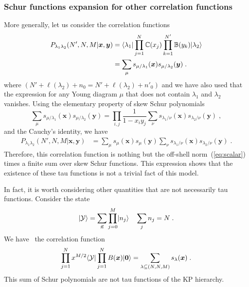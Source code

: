 \documentclass[a4paper,11pt]{amsart}
\begin{document}
\subsubsection{Schur functions expansion for other correlation functions}
More generally, let us consider the correlation functions 
\begin{equation}
\begin{split}
  P_{\lambda_1 \lambda_2}(N', N, M|\bm{x}, \bm{y}) & =
  \langle\lambda_1\rvert \prod_{j=1}^N \mathbb{C}(x_j)
  \prod_{k=1}^{N'} \mathbb{B}(y_k)\lvert\lambda_2\rangle \\
  & = \sum_{\mu} s_{\mu/\lambda_1}(\bm{x}) s_{\mu/\lambda_2}(\bm{y}) \; .
\end{split}
\end{equation}
where \((N' + \ell(\lambda_2) + n_0 = N' + \ell(\lambda_2) + n'_0)\) and 
we have also used that the expression for any Young diagram
\(\mu\) that does not contain \(\lambda_1\) and \(\lambda_2\)
vanishes. Using the elementary property of skew Schur
polynomials~\cite{Macdonald:1998}
\begin{equation}
  \sum_{\mu} s_{\mu/\lambda_1}(\bm{x}) s_{\mu/\lambda_2}(\bm{y}) = \prod_{i,j}\frac{1}{1 - x_i y_j}
 \sum_\nu s_{\lambda_1/\nu}(\bm{x}) s_{\lambda_2/\nu}(\bm{y})\; ,
\end{equation}
and the Cauchy's identity, we have 
\begin{equation}
\begin{split}
  P_{\lambda_1 \lambda_2}(N', N, M|\bm{x}, \bm{y}) & =
 \sum_\mu s_{\mu}(\bm{x}) s_{\mu}(\bm{y})
 \sum_\nu s_{\lambda_1/\nu}(\bm{x}) s_{\lambda_2/\nu}(\bm{y})\; .
\end{split}
\end{equation}
Therefore, this correlation function is nothing but the off-shell
norm~(\ref{eq:scalar}) times a finite sum over skew Schur functions.
This expression shows that the existence of these tau functions is not
a trivial fact of this model.

In fact, it is worth considering other quantities that are not
necessarily tau functions. Consider the state
\begin{equation}
  \lvert\mathcal{Y}\rangle =
 \sum_{\vec{n}} \prod_{j=0}^M \lvert n_j\rangle\quad \sum_j n_j = N\; .
\end{equation}
We have~\cite{Bogoliubov2005} the correlation function 
\begin{equation}
  \prod_{j=1}^N x^{M/2} \langle\mathcal{Y}\rvert \prod_{j=1}^N B(\bm{x}) \lvert\bm{0}\rangle = 
  \sum_{\lambda\subseteq (N,N,M)} s_\lambda(\bm{x})\; . 
\end{equation}
This sum of Schur polynomials are not tau functions of the KP hierarchy.
\end{document}
